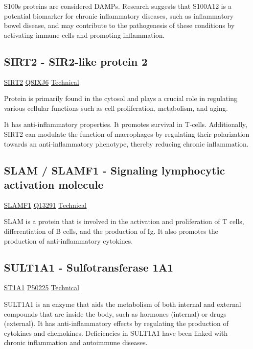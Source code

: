 S100s proteins are considered DAMPs. Research suggests that S100A12 is a potential biomarker for chronic inflammatory diseases, such as inflammatory bowel disease, and may contribute to the pathogenesis of these conditions by activating immune cells and promoting inflammation.

\subsection{SIRT2 - SIR2-like protein 2}

\href{https://en.wikipedia.org/wiki/Sirtuin_2}{SIRT2}
\href{http://www.uniprot.org/uniprot/Q8IXJ6}{Q8IXJ6}
\href{https://olink.com/products-services/explore/protein/?proteinID=OID21375}{Technical}

Protein is primarily found in the cytosol and plays a crucial role in regulating various cellular functions such as cell proliferation, metabolism, and aging.

It has anti-inflammatory properties. It promotes survival in T-cells. Additionally, SIRT2 can modulate the function of macrophages by regulating their polarization towards an anti-inflammatory phenotype, thereby reducing chronic inflammation.


\subsection{SLAM / SLAMF1 - Signaling lymphocytic activation molecule}

\href{https://en.wikipedia.org/wiki/Signaling \textunderscore lymphocytic \textunderscore activation \textunderscore molecule}{SLAMF1}
\href{http://www.uniprot.org/uniprot/Q13291}{Q13291}
\href{https://olink.com/products-services/target/protein/?assayID=5041}{Technical}

SLAM is a protein that is involved in the activation and proliferation of T cells, differentiation of B cells, and the production of Ig. It also promotes the production of anti-inflammatory cytokines.

\subsection{SULT1A1 - Sulfotransferase 1A1}

\href{https://en.wikipedia.org/wiki/SULT1A1}{ST1A1}
\href{http://www.uniprot.org/uniprot/P50225}{P50225}
\href{https://olink.com/products-services/target/protein/?assayID=5115}{Technical}

SULT1A1 is an enzyme that aids the metabolism of both internal and external compounds that are inside the body, such as hormones (internal) or drugs (external). It has anti-inflammatory effects by regulating the production of cytokines and chemokines. Deficiencies in SULT1A1 have been linked with chronic inflammation and autoimmune diseases.

